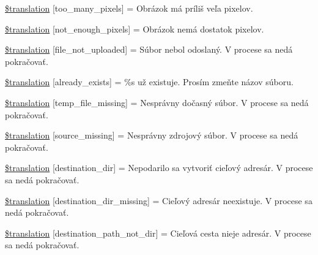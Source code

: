 \begin{DoxyCompactItemize}
\item 
\hyperlink{class_8upload_8sk___s_k_8php_aa4051ef64e94a3f8295c63cf85544016}{\$translation} \mbox{[}\textquotesingle{}too\+\_\+many\+\_\+pixels\textquotesingle{}\mbox{]} = \textquotesingle{}Obrázok má príliš veľa pixelov.\textquotesingle{}
\item 
\hyperlink{class_8upload_8sk___s_k_8php_a1fe342c27ce61f4ff4e0120ba647033e}{\$translation} \mbox{[}\textquotesingle{}not\+\_\+enough\+\_\+pixels\textquotesingle{}\mbox{]} = \textquotesingle{}Obrázok nemá dostatok pixelov.\textquotesingle{}
\item 
\hyperlink{class_8upload_8sk___s_k_8php_a4ce76e7be0b3a03c2b47f6d70c21832e}{\$translation} \mbox{[}\textquotesingle{}file\+\_\+not\+\_\+uploaded\textquotesingle{}\mbox{]} = \textquotesingle{}Súbor nebol odoslaný. V procese sa nedá pokračovať.\textquotesingle{}
\item 
\hyperlink{class_8upload_8sk___s_k_8php_afd84e910217f04139f567c41e292afa5}{\$translation} \mbox{[}\textquotesingle{}already\+\_\+exists\textquotesingle{}\mbox{]} = \textquotesingle{}\%s už existuje. Prosím zmeňte názov súboru.\textquotesingle{}
\item 
\hyperlink{class_8upload_8sk___s_k_8php_ab0fa87a88aba2624004581eed0633325}{\$translation} \mbox{[}\textquotesingle{}temp\+\_\+file\+\_\+missing\textquotesingle{}\mbox{]} = \textquotesingle{}Nesprávny dočasný súbor. V procese sa nedá pokračovať.\textquotesingle{}
\item 
\hyperlink{class_8upload_8sk___s_k_8php_aceaaf7355acaaf10f0ae60378d03c468}{\$translation} \mbox{[}\textquotesingle{}source\+\_\+missing\textquotesingle{}\mbox{]} = \textquotesingle{}Nesprávny zdrojový súbor. V procese sa nedá pokračovať.\textquotesingle{}
\item 
\hyperlink{class_8upload_8sk___s_k_8php_aff2427c72a2598aefa6d58df1dd18b08}{\$translation} \mbox{[}\textquotesingle{}destination\+\_\+dir\textquotesingle{}\mbox{]} = \textquotesingle{}Nepodarilo sa vytvoriť cieľový adresár. V procese sa nedá pokračovať.\textquotesingle{}
\item 
\hyperlink{class_8upload_8sk___s_k_8php_a9ef28d3cf09942c6c0a1e77fa09185e8}{\$translation} \mbox{[}\textquotesingle{}destination\+\_\+dir\+\_\+missing\textquotesingle{}\mbox{]} = \textquotesingle{}Cieľový adresár neexistuje. V procese sa nedá pokračovať.\textquotesingle{}
\item 
\hyperlink{class_8upload_8sk___s_k_8php_a5704a67137126e8c87b7a364175929d4}{\$translation} \mbox{[}\textquotesingle{}destination\+\_\+path\+\_\+not\+\_\+dir\textquotesingle{}\mbox{]} = \textquotesingle{}Cieľová cesta nieje adresár. V procese sa nedá pokračovať.\textquotesingle{}

\end{DoxyCompactItemize}
